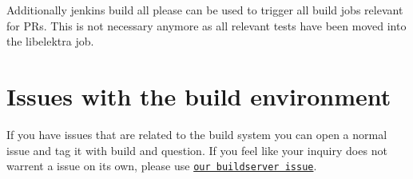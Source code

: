 Additionally {\ttfamily jenkins build all please} can be used to trigger all build jobs relevant for PR\textquotesingle{}s. This is not necessary anymore as all relevant tests have been moved into the libelektra job.

\section*{Issues with the build environment}

If you have issues that are related to the build system you can open a normal issue and tag it with {\ttfamily build} and {\ttfamily question}. If you feel like your inquiry does not warrent a issue on its own, please use \href{https://issues.libelektra.org/160}{\tt our buildserver issue}. 